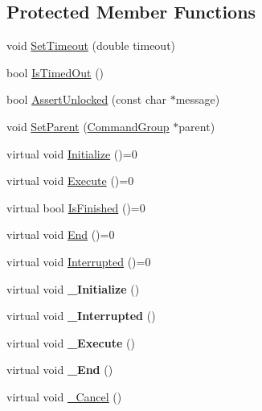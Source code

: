 \subsection*{Protected Member Functions}
\begin{DoxyCompactItemize}
\item 
void \hyperlink{classCommand_a44e6ef53469416e3b91e445a34988c5b}{SetTimeout} (double timeout)
\item 
bool \hyperlink{classCommand_ad1283feb94bb07985eaafe1586ab2ff7}{IsTimedOut} ()
\item 
bool \hyperlink{classCommand_a51e42d83c96de891fc5f9b7b40be52bd}{AssertUnlocked} (const char $\ast$message)
\item 
void \hyperlink{classCommand_a5992f2282e4132517e933cc39cb3c774}{SetParent} (\hyperlink{classCommandGroup}{CommandGroup} $\ast$parent)
\item 
virtual void \hyperlink{classCommand_a35b4c5ab42d8190791863cc8f1224231}{Initialize} ()=0
\item 
virtual void \hyperlink{classCommand_a484c34647660fcfc8ee46b04ad5b32b6}{Execute} ()=0
\item 
virtual bool \hyperlink{classCommand_a350a1e6657cd59f177f55e8451e60aa9}{IsFinished} ()=0
\item 
virtual void \hyperlink{classCommand_aafdfd2fd2f1d005c20b7f9e60450dc7a}{End} ()=0
\item 
virtual void \hyperlink{classCommand_adaad5530c4dfdaac5e503ca373548a8e}{Interrupted} ()=0
\item 
\hypertarget{classCommand_a5633a101ed7e5baa81787bb68cbe7f2a}{
virtual void {\bfseries \_\-Initialize} ()}
\label{classCommand_a5633a101ed7e5baa81787bb68cbe7f2a}

\item 
\hypertarget{classCommand_a134fe548f337d8caa1f26e0a322e3e74}{
virtual void {\bfseries \_\-Interrupted} ()}
\label{classCommand_a134fe548f337d8caa1f26e0a322e3e74}

\item 
\hypertarget{classCommand_a54d80458f016277275706316c55ca484}{
virtual void {\bfseries \_\-Execute} ()}
\label{classCommand_a54d80458f016277275706316c55ca484}

\item 
\hypertarget{classCommand_a3115f0e20e980e935fb3746b33e94368}{
virtual void {\bfseries \_\-End} ()}
\label{classCommand_a3115f0e20e980e935fb3746b33e94368}

\item 
virtual void \hyperlink{classCommand_a2e36a819254da2bb9badb3227bdfe336}{\_\-Cancel} ()
\end{DoxyCompactItemize}
